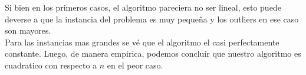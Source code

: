 Si bien en los primeros casos, el algoritmo pareciera no ser lineal, esto puede deverse a que la instancia del problema es muy pequeña y los outliers en ese caso son mayores.
\\
Para las instancias mas grandes se vé que el algoritmo el casi perfectamente constante. Luego, de manera empirica, podemos concluír que nuestro algoritmo es cuadratico con respecto a $n$ en el peor caso.